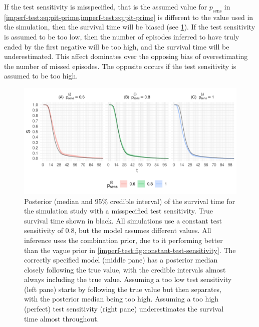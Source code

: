 \documentclass[thesis.tex]{subfiles}
\begin{document}
If the test sensitivity is misspecified, that is the assumed value for $p_\text{sens}$ in \cref{imperf-test:eq:pit-prime,imperf-test:eq:pit-prime} is different to the value used in the simulation, then the survival time will be biased (see \cref{imperf-test:fig:misspecified-test-sensitivity}).
If the test sensitivity is assumed to be too low, then the number of episodes inferred to have truly ended by the first negative will be too high, and the survival time will be underestimated.
This affect dominates over the opposing bias of overestimating the number of missed episodes.
The opposite occurs if the test sensitivity is assumed to be too high.
\begin{figure}
    \includegraphics[width=\textwidth]{cis-imperfect-testing/sim-misspecified-sensitivity}
  \caption[Simulation study results with misspecified test sensitivity]{%
    Posterior (median and 95\% credible interval) of the survival time for the simulation study with a misspecified test sensitivity.
    True survival time shown in black.
    All simulations use a constant test sensitivity of 0.8, but the model assumes different values.
    All inference uses the combination prior, due to it performing better than the vague prior in \cref{imperf-test:fig:constant-test-sensitivity}.
    The correctly specified model (middle pane) has a posterior median closely following the true value, with the credible intervals almost always including the true value.
    Assuming a too low test sensitivity (left pane) starts by following the true value but then separates, with the posterior median being too high.
    Assuming a too high (perfect) test sensitivity (right pane) underestimates the survival time almost throughout.
  }
  \label{imperf-test:fig:misspecified-test-sensitivity}
\end{figure}
\end{document}
